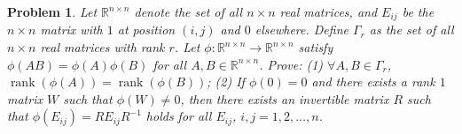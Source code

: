 \documentclass[11pt]{article}
\numberwithin{equation}{section}
\newtheorem{thm}{Problem}
\begin{document}
\begin{thm}
    Let $\mathbb{R}^{n \times n}$ denote the set of all $n \times n$ real matrices, and $E_{ij}$ be the $n \times n$ matrix with $1$ at position $(i,j)$ and $0$ elsewhere. Define $\Gamma_r$ as the set of all $n \times n$ real matrices with rank $r$. Let $\phi : \mathbb{R}^{n \times n} \to \mathbb{R}^{n \times n}$ satisfy $\phi(AB)=\phi(A)\phi(B)$ for all $A,B \in \mathbb{R}^{n \times n}$. Prove:  
(1) $\forall A,B \in \Gamma_r$, $\operatorname{rank}(\phi(A))=\operatorname{rank}(\phi(B))$;  
(2) If $\phi(0)=0$ and there exists a rank $1$ matrix $W$ such that $\phi(W)\neq 0$, then there exists an invertible matrix $R$ such that $\phi(E_{ij}) = R E_{ij} R^{-1}$ holds for all $E_{ij}$, $i,j = 1,2,\ldots,n$.

\end{thm}
\end{document}
